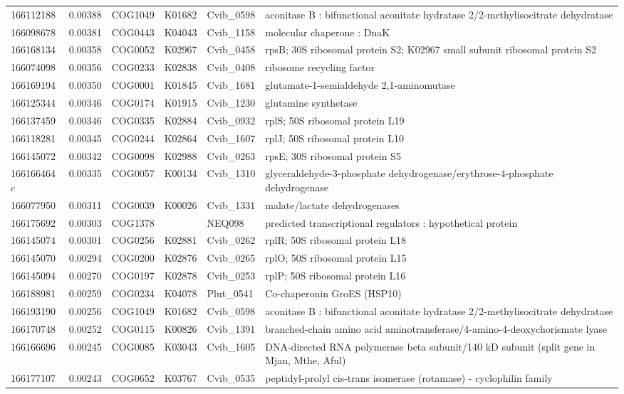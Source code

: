 \begin{landscape}
\begin{longtable}{p{1.8cm}p{0.9cm}p{2.2cm}p{1cm}p{2.8cm}p{13.4cm}}
166112188&0.00388&COG1049&K01682&Cvib\_0598&aconitase B : bifunctional aconitate hydratase 2/2-methylisocitrate dehydratase \\
166098678&0.00381&COG0443&K04043&Cvib\_1158&molecular chaperone : DnaK \\
166168134&0.00358&COG0052&K02967&Cvib\_0458&rpsB; 30S ribosomal protein S2; K02967 small subunit ribosomal protein S2 \\
166074098&0.00356&COG0233&K02838&Cvib\_0408&ribosome recycling factor \\
166169194&0.00350&COG0001&K01845&Cvib\_1681&glutamate-1-semialdehyde 2,1-aminomutase \\
166125344&0.00346&COG0174&K01915&Cvib\_1230&glutamine synthetase \\
166137459&0.00346&COG0335&K02884&Cvib\_0932&rplS; 50S ribosomal protein L19 \\
166118281&0.00345&COG0244&K02864&Cvib\_1607&rplJ; 50S ribosomal protein L10 \\
166145072&0.00342&COG0098&K02988&Cvib\_0263&rpsE; 30S ribosomal protein S5 \\
166166464$c$&0.00335&COG0057&K00134&Cvib\_1310&glyceraldehyde-3-phosphate dehydrogenase/erythrose-4-phosphate dehydrogenase \\
166077950&0.00311&COG0039&K00026&Cvib\_1331&malate/lactate dehydrogenases \\
166175692&0.00303&COG1378&&NEQ098&predicted transcriptional regulators : hypothetical protein \\
166145074&0.00301&COG0256&K02881&Cvib\_0262&rplR; 50S ribosomal protein L18 \\
166145070&0.00294&COG0200&K02876&Cvib\_0265&rplO; 50S ribosomal protein L15 \\
166145094&0.00270&COG0197&K02878&Cvib\_0253&rplP; 50S ribosomal protein L16 \\
166188981&0.00259&COG0234&K04078&Plut\_0541&Co-chaperonin GroES (HSP10) \\
166193190&0.00256&COG1049&K01682&Cvib\_0598&aconitase B : bifunctional aconitate hydratase 2/2-methylisocitrate dehydratase \\
166170748&0.00252&COG0115&K00826&Cvib\_1391&branched-chain amino acid aminotransferase/4-amino-4-deoxychorismate lyase \\
166166696&0.00245&COG0085&K03043&Cvib\_1605&DNA-directed RNA polymerase beta subunit/140 kD subunit (split gene in Mjan, Mthe, Aful) \\
166177107&0.00243&COG0652&K03767&Cvib\_0535&peptidyl-prolyl cis-trans isomerase (rotamase) - cyclophilin family \\

\end{longtable}
\end{landscape}

